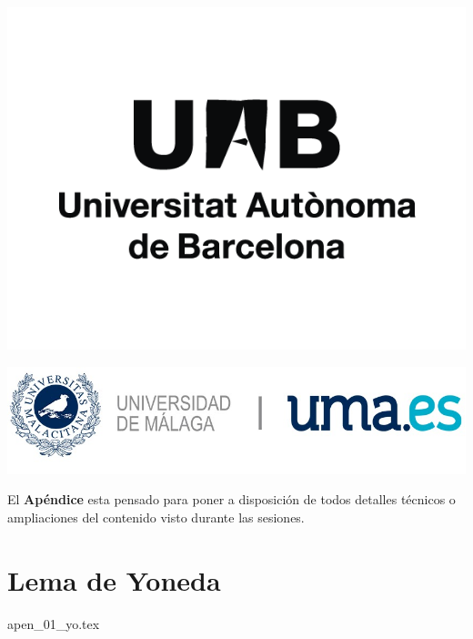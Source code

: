 \documentclass[12pt, a4paper]{article}
\begin{document}
\begin{titlepage}
\includegraphics[scale=0.25]{Logo_UAB.png}

\vspace*{\fill}

\vspace*{\fill}

\includegraphics[scale=0.25]{Logo_UMA.jpg}

\vspace*{\fill}
\end{titlepage}

El {\bf Apéndice} esta pensado para poner a disposición de todos detalles técnicos o ampliaciones del contenido visto durante las sesiones.

\tableofcontents

\newpage
\section{Lema de Yoneda}

{apen_01_yo.tex}
\end{document}
